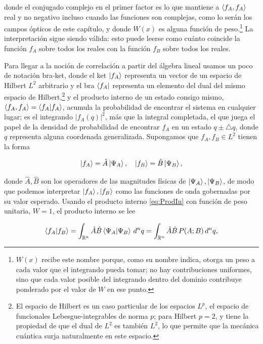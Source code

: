 	donde el conjugado complejo en el primer factor es lo que mantiene a $\braket{f_A,f_A}$ real y no negativo incluso cuando las funciones son complejas, como lo serán los campos ópticos de este capítulo, y donde $W(x)$ es alguna función de peso.\footnote{$W(x)$ recibe este nombre porque, como su nombre indica, otorga un peso a cada valor que el integrando pueda tomar; no hay contribuciones uniformes, sino que cada valor posible del integrando dentro del dominio contribuye ponderado por el valor de $W$ en ese punto.} La interpretación sigue siendo válida: esto puede leerse como cuánto coincide la función $f_A$ sobre todos los reales con la función $f_B$ sobre todos los reales.

	Para llegar a la noción de correlación a partir del álgebra lineal usamos un poco de notación bra-ket, donde el ket $\ket{f_A}$ representa un vector de un espacio de Hilbert $L^2$ arbitrario y el bra $\bra{f_A}$ representa un elemento del dual del mismo espacio de Hilbert,\footnote{El espacio de Hilbert es un caso particular de los espacios $L^p$, el espacio de funcionales Lebesgue-integrables de norma $p$; para Hilbert $p=2$, y tiene la propiedad de que el dual de $L^2$ es también $L^2$, lo que permite que la mecánica cuántica surja naturalmente en este espacio.} y el producto interno de un estado consigo mismo, $\braket{f_A,f_A}= \braket{f_A|f_A}$, acumula la probabilidad de encontrar el sistema en cualquier lugar; es el integrando $|f_A(q)|^2$, más que la integral completada, el que juega el papel de la densidad de probabilidad de encontrar $f_A$ en un estado $q \pm \triangle q$, donde $q$ representa alguna coordenada generalizada. Supongamos que $f_A,f_B \in L^2$ tienen la forma

	\begin{equation}
		\ket{f_A} = \hat{A}\ket{\Psi_A}, \quad \ket{f_B} = \hat{B}\ket{\Psi_B},
	\end{equation}

	donde $\hat{A},\hat{B}$ son los operadores de las magnitudes físicas de $\ket{\Psi_A},\ket{\Psi_B}$, de modo que podemos interpretar $\ket{f_A},\ket{f_B}$ como las funciones de onda gobernadas por su valor esperado. Usando el producto interno \eqref{eq:ProdIn} con función de peso unitaria, $W=1$, el producto interno se lee

	\begin{equation}
		\braket{f_A | f_B} = \int_{\mathbb{R}^n} \hat{A}\hat{B} \braket{\Psi_A|\Psi_B}\, d^nq = \int_{\mathbb{R}^n} \hat{A}\hat{B}\, P(A;B)\, d^nq,
	\end{equation}

